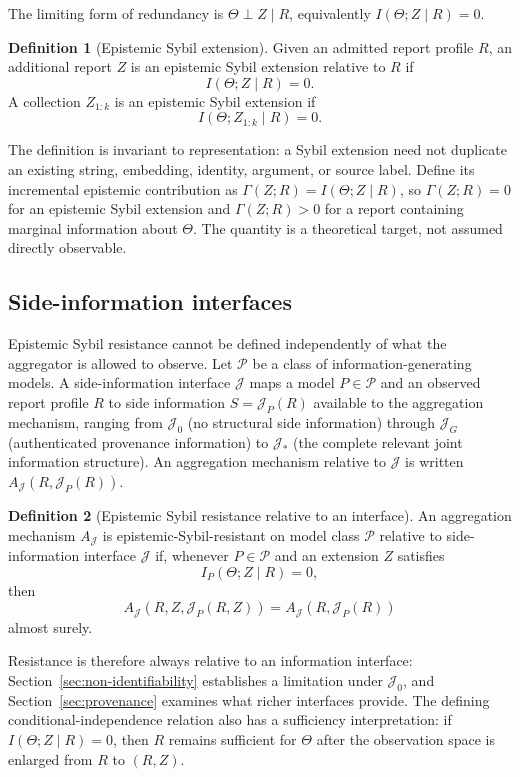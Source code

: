 \documentclass[11pt]{article}
\theoremstyle{definition}
\newtheorem{definition}{Definition}
\begin{document}
The limiting form of redundancy is $\Theta\perp Z\mid R$, equivalently $I(\Theta;Z\mid R)=0$.

\begin{definition}[Epistemic Sybil extension]
Given an admitted report profile $R$, an additional report $Z$ is an epistemic Sybil extension relative to $R$ if
\[
I(\Theta;Z\mid R)=0.
\]
A collection $Z_{1:k}$ is an epistemic Sybil extension if
\[
I(\Theta;Z_{1:k}\mid R)=0.
\]
\end{definition}

The definition is invariant to representation: a Sybil extension need not duplicate an existing string, embedding, identity, argument, or source label. Define its incremental epistemic contribution as $\Gamma(Z;R)=I(\Theta;Z\mid R)$, so $\Gamma(Z;R)=0$ for an epistemic Sybil extension and $\Gamma(Z;R)>0$ for a report containing marginal information about $\Theta$. The quantity is a theoretical target, not assumed directly observable.

\subsection{Side-information interfaces}
\label{sec:interfaces}

Epistemic Sybil resistance cannot be defined independently of what the aggregator is allowed to observe. Let $\mathcal P$ be a class of information-generating models. A side-information interface $\mathcal J$ maps a model $P\in\mathcal P$ and an observed report profile $R$ to side information $S=\mathcal J_P(R)$ available to the aggregation mechanism, ranging from $\mathcal J_0$ (no structural side information) through $\mathcal J_G$ (authenticated provenance information) to $\mathcal J_*$ (the complete relevant joint information structure). An aggregation mechanism relative to $\mathcal J$ is written $A_{\mathcal J}(R,\mathcal J_P(R))$.

\begin{definition}[Epistemic Sybil resistance relative to an interface]
\label{def:esr-interface}
An aggregation mechanism $A_{\mathcal J}$ is epistemic-Sybil-resistant on model class $\mathcal P$ relative to side-information interface $\mathcal J$ if, whenever $P\in\mathcal P$ and an extension $Z$ satisfies
\[
I_P(\Theta;Z\mid R)=0,
\]
then
\[
A_{\mathcal J}\left(R,Z,\mathcal J_P(R,Z)\right)
=
A_{\mathcal J}\left(R,\mathcal J_P(R)\right)
\]
almost surely.
\end{definition}

Resistance is therefore always relative to an information interface: Section~\ref{sec:non-identifiability} establishes a limitation under $\mathcal J_0$, and Section~\ref{sec:provenance} examines what richer interfaces provide. The defining conditional-independence relation also has a sufficiency interpretation: if $I(\Theta;Z\mid R)=0$, then $R$ remains sufficient for $\Theta$ after the observation space is enlarged from $R$ to $(R,Z)$.
\end{document}
